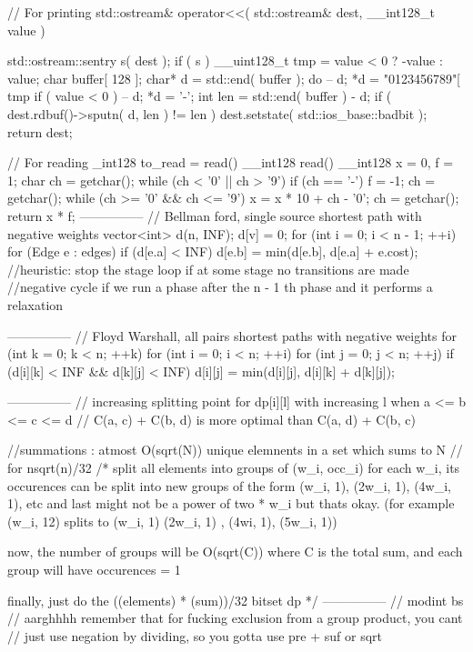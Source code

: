// For printing
std::ostream&
operator<<( std::ostream& dest, __int128_t value ) {
	std::ostream::sentry s( dest );
	if ( s ) {
		__uint128_t tmp = value < 0 ? -value : value; char buffer[ 128 ];
		char* d = std::end( buffer );
		do {	-- d; *d = "0123456789"[ tmp %
		if ( value < 0 ) {-- d; *d = '-';}
		int len = std::end( buffer ) - d;
		if ( dest.rdbuf()->sputn( d, len ) != len ) {dest.setstate( std::ios_base::badbit );}
	}
	return dest;
}

// For reading _int128 to_read = read()
__int128 read() {
	__int128 x = 0, f = 1;
	char ch = getchar();
	while (ch < '0' || ch > '9') {if (ch == '-') f = -1; ch = getchar();}
	while (ch >= '0' && ch <= '9') {x = x * 10 + ch - '0'; ch = getchar();}
	return x * f;
}
---------------
// Bellman ford, single source shortest path with negative weights
vector<int> d(n, INF);
d[v] = 0;
for (int i = 0; i < n - 1; ++i)
    for (Edge e : edges)
        if (d[e.a] < INF)
            d[e.b] = min(d[e.b], d[e.a] + e.cost);
//heuristic: stop the stage loop if at some stage no transitions are made
//negative cycle if we run a phase after the n - 1 th phase and it performs a relaxation

---------------
// Floyd Warshall, all pairs shortest paths with negative weights
for (int k = 0; k < n; ++k)
    for (int i = 0; i < n; ++i)
        for (int j = 0; j < n; ++j)
            if (d[i][k] < INF && d[k][j] < INF)
                d[i][j] = min(d[i][j], d[i][k] + d[k][j]); 

---------------
// increasing splitting point for dp[i][l] with increasing l when a <= b <= c <= d
// C(a, c) + C(b, d) is more optimal than C(a, d) + C(b, c)

//summations : atmost O(sqrt(N)) unique elemnents in a set which sums to N
// for nsqrt(n)/32
/*
split all elements into groups of (w_i, occ_i)
for each w_i, its occurences can be split into new groups of the form (w_i, 1), (2w_i, 1), (4w_i, 1), etc and 
last might not be a power of two * w_i but thats okay. (for example (w_i, 12) splits to (w_i, 1) (2w_i, 1)
, (4wi, 1), (5w_i, 1))

now, the number of groups will be O(sqrt(C)) where C is the total sum, and each group will have occurences = 1

finally, just do the ((elements) * (sum))/32 bitset dp
*/
---------------
// modint bs
// aarghhhh remember that for fucking exclusion from a group product, you cant
// just use negation by dividing, so you gotta use pre + suf or sqrt

}
